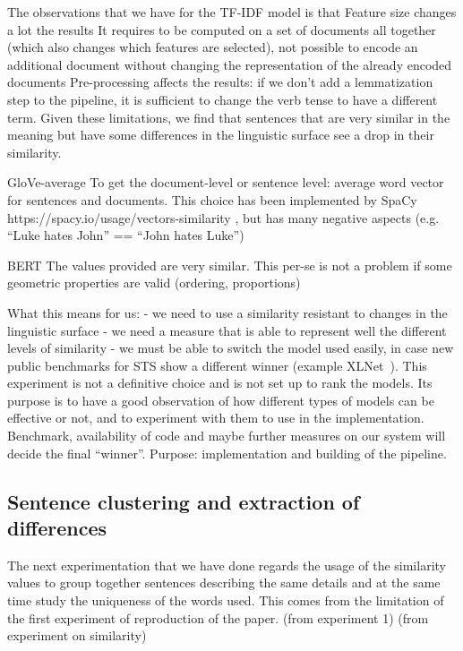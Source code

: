 The observations that we have for the TF-IDF model is that
Feature size changes a lot the results
It requires to be computed on a set of documents all together (which also changes which features are selected), not possible to encode an additional document without changing the representation of the already encoded documents
Pre-processing affects the results: if we don’t add a lemmatization step to the pipeline, it is sufficient to change the verb tense to have a different term.
Given these limitations, we find that sentences that are very similar in the meaning but have some differences in the linguistic surface see a drop in their similarity.

GloVe-average
To get the document-level or sentence level: average word vector for sentences and documents. This choice has been implemented by SpaCy https://spacy.io/usage/vectors-similarity , but has many negative aspects (e.g. “Luke hates John” == “John hates Luke”) 

BERT
The values provided are very similar. This per-se is not a problem if some geometric properties are valid (ordering, proportions)



What this means for us:
- we need to use a similarity resistant to changes in the linguistic surface
- we need a measure that is able to represent well the different levels of similarity
- we must be able to switch the model used easily, in case new public benchmarks for STS show a different winner (example XLNet~\cite{yang2019xlnet}).
This experiment is not a definitive choice and is not set up to rank the models. Its purpose is to have a good observation of how different types of models can be effective or not, and to experiment with them to use in the implementation.
Benchmark, availability of code and maybe further measures on our system will decide the final ``winner''.
Purpose: implementation and building of the pipeline.


\subsection{Sentence clustering and extraction of differences}
The next experimentation that we have done regards the usage of the similarity values to group together sentences describing the same details and at the same time study the uniqueness of the words used.
This comes from the limitation of the first experiment of reproduction of the paper. (from experiment 1)
(from experiment on similarity)


